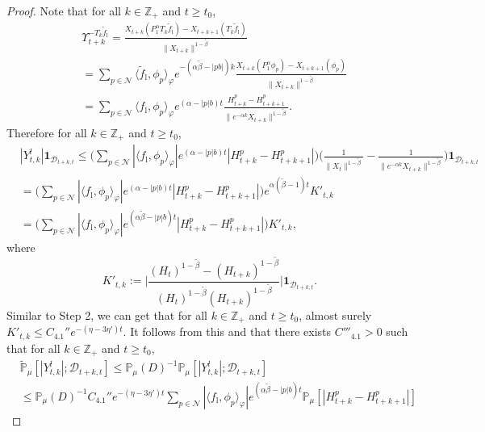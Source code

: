 \documentclass[12pt,a4paper]{amsart}
\theoremstyle{plain}
\theoremstyle{definition}
\numberwithin{equation}{section}
\begin{document}
\begin{proof}
 Note that for all $k \in \mathbb Z_+$ and $t\geq t_ 0$,
  \begin{align}
    & \Upsilon_{t+k}^{-T_k\tilde f_\mathrm l}
      = \frac{X_{t+k}(P^\alpha_1T_k\tilde f_\mathrm l) - X_{t+k+1}(T_k \tilde f_\mathrm l)}{\|X_{t+k}\|^{1 - \tilde \beta}}
    \\& = \sum_{p\in \mathcal N}
    \langle\tilde f_\mathrm l,\phi_p\rangle_\varphi e^{-(\alpha \tilde \beta - |pb|)k}\frac{ X_{t+k}(P_1^\alpha \phi_p) - X_{t+k+1}(\phi_p)}{\|X_{t+k}\|^{1 - \tilde \beta}}
    \\& = \sum_{p\in \mathcal N}
    \langle f_\mathrm l,\phi_p\rangle_\varphi  e^{(\alpha  -|p|b)t}\frac{H_{t+k}^p-H_{t+k+1}^p }{\|e^{-\alpha k}X_{t+k}\|^{1 - \tilde \beta}}.
  \end{align}
  Therefore for all $k\in \mathbb Z_+$ and $t\geq t_0$,
  \begin{align}
    &|Y^l_{t,k}| \mathbf 1_{\mathcal D_{t+k,t}}
      \leq \Big( \sum_{p\in \mathcal N}|\langle f_\mathrm l,\phi_p\rangle_\varphi|  e^{(\alpha  -|p|b)t} | H_{t+k}^p-H_{t+k+1}^p |\Big) \Big( \frac{1}{\|X_t\|^{1 - \tilde \beta}} - \frac{1}{\|e^{-\alpha k}X_{t+k}\|^{1 - \tilde \beta}} \Big)\mathbf 1_{\mathcal D_{t+k,t}}
    \\ &= \Big( \sum_{p\in \mathcal N}|\langle f_\mathrm l,\phi_p\rangle_\varphi|  e^{(\alpha  -|p|b)t} | H_{t+k}^p-H_{t+k+1}^p |\Big)e^{\alpha (\tilde \beta - 1)t} K'_{t,k}
    \\ &= \Big( \sum_{p\in \mathcal N}|\langle f_\mathrm l,\phi_p\rangle_\varphi|  e^{(\alpha \tilde \beta  -|p|b)t} | H_{t+k}^p-H_{t+k+1}^p |\Big) K'_{t,k},
  \end{align}
  where
  \[
    K'_{t,k}
        := \Big| \frac {(H_t)^{1- \tilde \beta} - (H_{t+k})^{1 - \tilde \beta}} {(H_t)^{1 - \tilde \beta} (H_{t+k})^{ 1- \tilde \beta }} \Big| \mathbf{1}_{\mathcal{D}_{t+k,t}}.
  \]
  Similar to Step 2, we can get that for all $k\in \mathbb Z_+$ and $t\geq t_0$, almost surely $K'_{t,k} \leq C_{4.1}'' e^{- (\eta - 3\eta')t}$.
  It follows from this and \cite[Lemma 3.3]{RenSongSunZhao2019Stable} that there exists $C'''_{4.1}>0$ such that for all $k\in \mathbb Z_+$ and $t\geq t_0$,
  \begin{align}
    & \widetilde{\mathbb P}_\mu[|Y^l_{t,k}|; \mathcal D_{t+k,t}]
      \leq \mathbb P_\mu(D)^{-1}\mathbb P_\mu[ |Y^l_{t,k}| ;\mathcal D_{t+k,t} ]
    \\ & \leq \mathbb P_{\mu}(D)^{-1} C_{4.1}'' e^{- (\eta - 3\eta') t}\sum_{p\in \mathcal {N}} |\langle f_\mathrm l,\phi_p\rangle_\varphi|  e^{(\alpha \tilde \beta  -|p|b)t} \mathbb P_\mu[| H_{t+k}^p-H_{t+k+1}^p |]

\end{align}
\end{proof}
\end{document}

